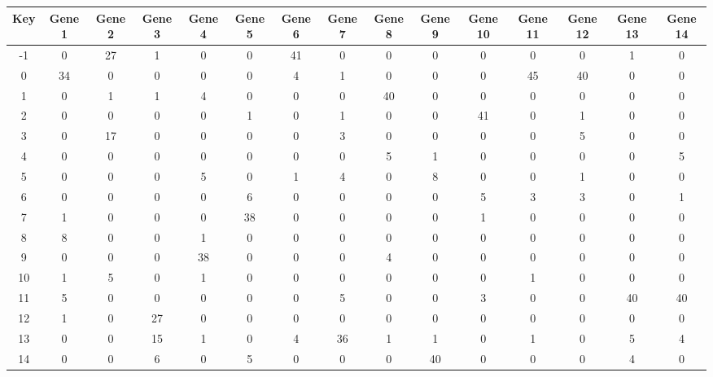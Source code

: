 \begin{tabular}{|c|c|c|c|c|c|c|c|c|c|c|c|c|c|c|}
\hline
Key & Gene 1 & Gene 2 & Gene 3 & Gene 4 & Gene 5 & Gene 6 & Gene 7 & Gene 8 & Gene 9 & Gene 10 & Gene 11 & Gene 12 & Gene 13 & Gene 14 \\
\hline
-1 & 0 & 27 & 1 & 0 & 0 & 41 & 0 & 0 & 0 & 0 & 0 & 0 & 1 & 0 \\
0 & 34 & 0 & 0 & 0 & 0 & 4 & 1 & 0 & 0 & 0 & 45 & 40 & 0 & 0 \\
1 & 0 & 1 & 1 & 4 & 0 & 0 & 0 & 40 & 0 & 0 & 0 & 0 & 0 & 0 \\
2 & 0 & 0 & 0 & 0 & 1 & 0 & 1 & 0 & 0 & 41 & 0 & 1 & 0 & 0 \\
3 & 0 & 17 & 0 & 0 & 0 & 0 & 3 & 0 & 0 & 0 & 0 & 5 & 0 & 0 \\
4 & 0 & 0 & 0 & 0 & 0 & 0 & 0 & 5 & 1 & 0 & 0 & 0 & 0 & 5 \\
5 & 0 & 0 & 0 & 5 & 0 & 1 & 4 & 0 & 8 & 0 & 0 & 1 & 0 & 0 \\
6 & 0 & 0 & 0 & 0 & 6 & 0 & 0 & 0 & 0 & 5 & 3 & 3 & 0 & 1 \\
7 & 1 & 0 & 0 & 0 & 38 & 0 & 0 & 0 & 0 & 1 & 0 & 0 & 0 & 0 \\
8 & 8 & 0 & 0 & 1 & 0 & 0 & 0 & 0 & 0 & 0 & 0 & 0 & 0 & 0 \\
9 & 0 & 0 & 0 & 38 & 0 & 0 & 0 & 4 & 0 & 0 & 0 & 0 & 0 & 0 \\
10 & 1 & 5 & 0 & 1 & 0 & 0 & 0 & 0 & 0 & 0 & 1 & 0 & 0 & 0 \\
11 & 5 & 0 & 0 & 0 & 0 & 0 & 5 & 0 & 0 & 3 & 0 & 0 & 40 & 40 \\
12 & 1 & 0 & 27 & 0 & 0 & 0 & 0 & 0 & 0 & 0 & 0 & 0 & 0 & 0 \\
13 & 0 & 0 & 15 & 1 & 0 & 4 & 36 & 1 & 1 & 0 & 1 & 0 & 5 & 4 \\
14 & 0 & 0 & 6 & 0 & 5 & 0 & 0 & 0 & 40 & 0 & 0 & 0 & 4 & 0 \\
\hline
\end{tabular}